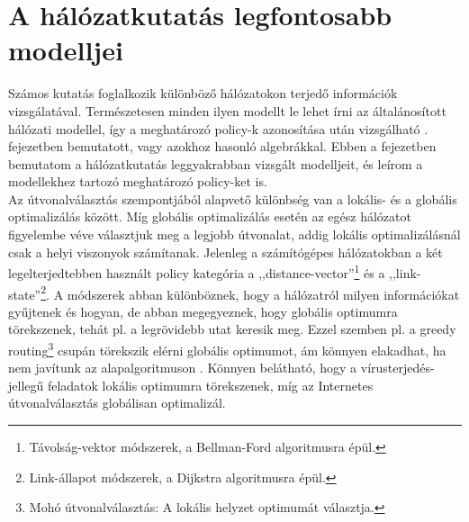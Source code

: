 
\chapter{A hálózatkutatás legfontosabb modelljei}\label{examples}
\setcounter{note}{0}

Számos kutatás foglalkozik különböző hálózatokon terjedő információk vizsgálatával. Természetesen minden ilyen modellt le lehet írni az általánosított hálózati modellel, így a meghatározó policy-k azonosítása után vizsgálható . fejezetben bemutatott, vagy azokhoz hasonló algebrákkal. Ebben a fejezetben bemutatom a hálózatkutatás leggyakrabban vizsgált modelljeit, és leírom a modellekhez tartozó meghatározó policy-ket is.\\

Az útvonalválasztás szempontjából alapvető különbség van a lokális- és a globális optimalizálás között. Míg globális optimalizálás esetén az egész hálózatot figyelembe véve választjuk meg a legjobb útvonalat, addig lokális optimalizálásnál csak a helyi viszonyok számítanak. Jelenleg a számítógépes hálózatokban a két legelterjedtebben használt policy kategória a ,,distance-vector''\footnote{Távolság-vektor módszerek, a Bellman-Ford algoritmusra épül.} és a ,,link-state''\footnote{Link-állapot módszerek, a Dijkstra algoritmusra épül.}. A módszerek abban különböznek, hogy a hálózatról milyen információkat gyűjtenek és hogyan, de abban megegyeznek, hogy globális optimumra törekszenek, tehát pl. a legrövidebb utat keresik meg. Ezzel szemben pl. a greedy routing\footnote{Mohó útvonalválasztás: A lokális helyzet optimumát választja.} csupán törekszik elérni globális optimumot, ám könnyen elakadhat, ha nem javítunk az alapalgoritmuson \cite{Routing_with_Guaranteed_Delivery_in_Adhoc_Wireless_Networks}. Könnyen belátható, hogy a vírusterjedés-jellegű feladatok lokális optimumra törekszenek, míg az Internetes útvonalválasztás globálisan optimalizál.

